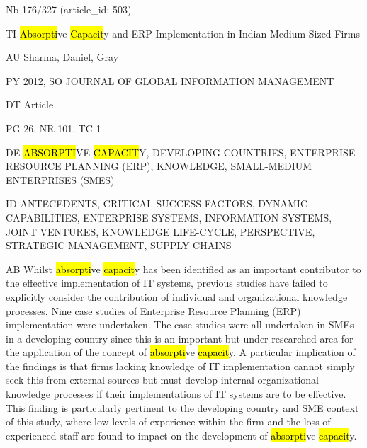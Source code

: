 \documentclass[a4paper]{article}
\begin{document}
\vspace*{-2cm}
Nb \tabto{0cm}176/327 (article\_id: 503)\par
TI \tabto{0cm}\hl{Absorpti}ve \hl{Capacit}y and ERP Implementation in Indian Medium-Sized Firms\par
AU \tabto{0cm}Sharma, Daniel, Gray\par
PY \tabto{0cm}2012, SO JOURNAL OF GLOBAL INFORMATION MANAGEMENT\par
DT \tabto{0cm}Article\par
PG \tabto{0cm}26, NR 101, TC 1\par
DE \tabto{0cm}\hl{ABSORPTI}VE \hl{CAPACIT}Y, DEVELOPING COUNTRIES, ENTERPRISE RESOURCE PLANNING (ERP), KNOWLEDGE, SMALL-MEDIUM ENTERPRISES (SMES)\par
ID \tabto{0cm}ANTECEDENTS, CRITICAL SUCCESS FACTORS, DYNAMIC CAPABILITIES, ENTERPRISE SYSTEMS, INFORMATION-SYSTEMS, JOINT VENTURES, KNOWLEDGE LIFE-CYCLE, PERSPECTIVE, STRATEGIC MANAGEMENT, SUPPLY CHAINS\par
AB \tabto{0cm}Whilst \hl{absorpti}ve \hl{capacit}y has been identified as an important contributor to the effective implementation of IT systems, previous studies have failed to explicitly consider the contribution of individual and organizational knowledge processes. Nine case studies of Enterprise Resource Planning (ERP) implementation were undertaken. The case studies were all undertaken in SMEs in a developing country since this is an important but under researched area for the application of the concept of \hl{absorpti}ve \hl{capacit}y. A particular implication of the findings is that firms lacking knowledge of IT implementation cannot simply seek this from external sources but must develop internal organizational knowledge processes if their implementations of IT systems are to be effective. This finding is particularly pertinent to the developing country and SME context of this study, where low levels of experience within the firm and the loss of experienced staff are found to impact on the development of \hl{absorpti}ve \hl{capacit}y.\par
\clearpage
\end{document}
